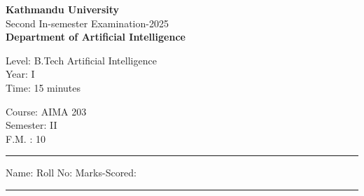 \documentclass[12pt]{exam}
\begin{document}
\begin{center}
  {\bfseries  {\large Kathmandu University}} \\
  Second In-semester Examination-2025 \\[-2mm]
    \textbf{\small Department of Artificial Intelligence}
\end{center}
\vspace{2mm}

\begin{minipage}{0.70\linewidth}
  \begin{flushleft}
    Level: B.Tech Artificial Intelligence \\
    Year: I \\
    Time: 15 minutes
  \end{flushleft}
\end{minipage} \hfill
\begin{minipage}{0.25\linewidth}
  \begin{flushleft}
    Course: AIMA 203 \\
    Semester: II \\
    F.M. : 10
  \end{flushleft}
\end{minipage}
\vspace{-8mm}
\begin{center}
  \rule{\textwidth}{1pt}
  Name: \hspace{5cm}  Roll No: \hspace{3cm} Marks-Scored:
  \vskip -3mm
\rule{\textwidth}{1pt}
\end{center}
\end{document}
